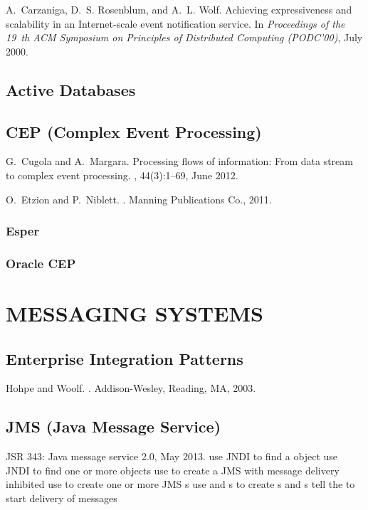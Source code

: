 \documentclass{myproc}
\begin{document}
\w A.~Carzaniga, D.~S. Rosenblum, and A.~L. Wolf.
\newblock Achieving expressiveness and scalability in an {I}nternet-scale event
  notification service.
\newblock In {\em Proceedings of the 19~th ACM Symposium on Principles of
  Distributed Computing (PODC'00)}, July 2000.
\eit

\subsection{Active Databases}
\bit
\w 
\eit

\subsection{CEP (Complex Event Processing)}
\bit
\w G.~Cugola and A.~Margara.
\newblock Processing flows of information: From data stream to complex event
  processing.
, 44(3):1--69, June 2012.

\w O.~Etzion and P.~Niblett.
.
\newblock Manning Publications Co., 2011.
\eit


\subsubsection{Esper}
\subsubsection{Oracle CEP}


\section{MESSAGING SYSTEMS}
\subsection{Enterprise Integration Patterns}
\bit
\w Hohpe and Woolf.
.
\newblock Addison-Wesley, Reading, MA, 2003.
\eit
\subsection{JMS (Java Message Service)}
\bit
\w JSR 343:
\newblock Java message service 2.0, May 2013.
\eit
\bit
\w {}
\ben
\w use JNDI to find a  object
\w use JNDI to find one or more  objects
\w use  to create a JMS  with message
delivery inhibited
\w use  to create one or more JMS s
\w use  and s to create s and
s
\w tell the  to start delivery of messages
\een
\eit
\end{document}
